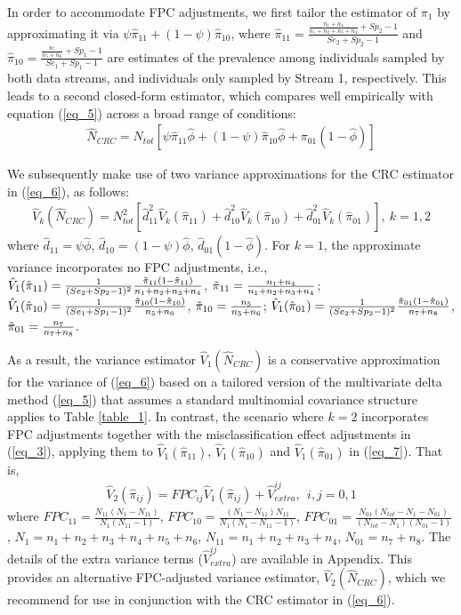 \documentclass[useAMS,usenatbib,referee]{biom}
\begin{document}
In order to accommodate FPC adjustments, we first tailor the estimator of $\pi_1$ by approximating it via $\psi\hat{\pi}_{11}+(1-\psi)\hat{\pi}_{10}$, where $\hat{\pi}_{11}= \frac{\frac{n_1+n_4}{n_1+n_2+n_3+n_4}+Sp_2-1}{Se_2+Sp_2-1}$ and $\hat{\pi}_{10}=\frac{\frac{n_5}{n_5+n_6}+Sp_1-1}{Se_1+Sp_1-1}$ are estimates of the prevalence among individuals sampled by both data streams, and individuals only sampled by Stream 1, respectively. This leads to a second closed-form estimator, which compares well empirically with equation (\ref{eq_5}) across a broad range of conditions:
\begin{align}
     \hat{N}_{CRC} = N_{tot}[\psi\hat{\pi}_{11}\hat{\phi}+(1-\psi)\hat{\pi}_{10}\hat{\phi} + \pi_{01}(1 - \hat{\phi})]
    \label{eq_6}   
\end{align}

We subsequently make use of two variance approximations for the CRC estimator in (\ref{eq_6}), as follows:
\begin{align}
    \hat{V}_{k}(\hat{N}_{CRC}) = N_{tot}^2[\hat{d}_{11}^2\hat{V}_k(\hat{\pi}_{11})+\hat{d}_{10}^2\hat{V}_k(\hat{\pi}_{10})+\hat{d}_{01}^2\hat{V}_k(\hat{\pi}_{01})],~k = 1,2\label{eq_7}
\end{align}
where $\hat{d}_{11}=\psi\hat{\phi}$, $\hat{d}_{10}=(1-\psi)\hat{\phi}$, $\hat{d}_{01}(1-\hat{\phi})$. For $k=1$, the approximate variance incorporates no FPC adjustments, i.e., $\hat{V}_1(\hat{\pi}_{11}) = \frac{1}{(Se_2+Sp_2-1)^2}\frac{\Tilde{\pi}_{11}(1-\Tilde{\pi}_{11})}{n_1+n_2+n_3+n_4}$, $\Tilde{\pi}_{11} = \frac{n_1+n_4}{n_1+n_2+n_3+n_4}$; $\hat{V}_1(\hat{\pi}_{10})=\frac{1}{(Se_1+Sp_1-1)^2}\frac{\Tilde{\pi}_{10}(1-\Tilde{\pi}_{10})}{n_5+n_6}$, $\Tilde{\pi}_{10}=\frac{n_5}{n_5+n_6}$; $\hat{V}_1(\hat{\pi}_{01})=\frac{1}{(Se_2+Sp_2-1)^2}\frac{\Tilde{\pi}_{01}(1-\Tilde{\pi}_{01})}{n_7+n_8}$, $\Tilde{\pi}_{01}=\frac{n_7}{n_7+n_8}$.

As a result, the variance estimator $\hat{V}_{1}(\hat{N}_{CRC})$ is a conservative approximation for the variance of (\ref{eq_6}) based on a tailored version of the multivariate delta method (\ref{eq_5}) that assumes a standard multinomial covariance structure applies to Table \ref{table_1}. In contrast, the scenario where $k=2$ incorporates FPC adjustments \citep{Cochran1977} together with the misclassification effect adjustments in (\ref{eq_3}), applying them to $\hat{V}_1(\hat{\pi}_{11})$, $\hat{V}_1(\hat{\pi}_{10})$ and $\hat{V}_1(\hat{\pi}_{01})$ in (\ref{eq_7}). That is,
\begin{align}
    \hat{V}_2(\hat{\pi}_{ij}) = FPC_{ij}\hat{V}_1(\hat{\pi}_{ij}) + \hat{V}_{extra}^{ij}, ~~ i,j=0,1 \label{eq_8}
\end{align}
where $FPC_{11}=\frac{N_{11}(N_1-N_{11})}{N_1(N_{11}-1)}$, $FPC_{10}=\frac{(N_1-N_{11})N_{11}}{N_1(N_1-N_{11}-1)}$, $FPC_{01}=\frac{N_{01}(N_{tot}-N_1-N_{01})}{(N_{tot}-N_1)(N_{01}-1)}$, $N_1=n_1+n_2+n_3+n_4+n_5+n_6$, $N_{11}=n_1+n_2+n_3+n_4$, $N_{01}=n_7+n_8$. The details of the extra variance terms ($\hat{V}_{extra}^{ij}$) are available in Appendix. This provides an alternative FPC-adjusted variance estimator, $\hat{V}_{2}(\hat{N}_{CRC})$, which we recommend for use in conjunction with the CRC estimator in (\ref{eq_6}).
\end{document}
